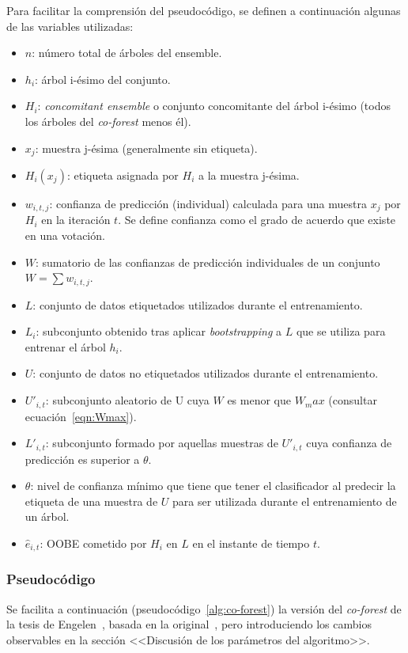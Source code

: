 Para facilitar la comprensión del pseudocódigo, se definen a continuación algunas de las variables utilizadas:
\begin{itemize}
	\item $n$: número total de árboles del ensemble.
	\item $h_{i}$: árbol i-ésimo del conjunto.
	\item $H_{i}$: \textit{concomitant ensemble} o conjunto concomitante del árbol i-ésimo (todos los árboles del \textit{co-forest} menos él).
	\item $x_j$: muestra j-ésima (generalmente sin etiqueta).
	\item $H_i(x_j)$: etiqueta asignada por $H_i$ a la muestra j-ésima.
	\item $w_{i,t,j}$: confianza de predicción (individual) calculada para una muestra $x_j$ por $H_{i}$ en la iteración $t$. Se define confianza como el grado de acuerdo que existe en una votación. 
	\item $W$: sumatorio de las confianzas de predicción individuales de un conjunto $W = \sum w_{i,t,j}$.
	\item $L$: conjunto de datos etiquetados utilizados durante el entrenamiento.
	\item $L_{i}$: subconjunto obtenido tras aplicar \textit{bootstrapping} a $L$ que se utiliza para entrenar el árbol $h_{i}$.
	\item $U$: conjunto de datos no etiquetados utilizados durante el entrenamiento.
	\item $U'_{i,t}$: subconjunto aleatorio de U cuya $W$ es menor que $W_max$ (consultar ecuación~\ref{eqn:Wmax}).
	\item $L'_{i,t}$: subconjunto formado por aquellas muestras de $U'_{i,t}$ cuya confianza de predicción es superior a $\theta$.
	\item $\theta$: nivel de confianza mínimo que tiene que tener el clasificador al predecir la etiqueta de una muestra de $U$ para ser utilizada durante el entrenamiento de un árbol.
	\item $\hat{e}_{i,t}$: OOBE cometido por $H_{i}$ en $L$ en el instante de tiempo $t$.
\end{itemize} 

\subsubsection{Pseudocódigo}

Se facilita a continuación (pseudocódigo~\ref{alg:co-forest}) la versión del \textit{co-forest} de la tesis de Engelen~\cite{engelen2018thesis}, basada en la original~\cite{originalCoForest2007}, pero introduciendo los cambios observables en la sección <<Discusión de los parámetros del algoritmo>>.

